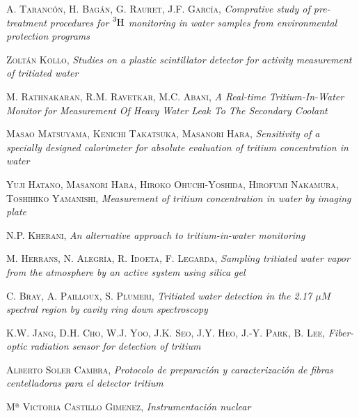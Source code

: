 \begin{thebibliography}{99}
 \textsc{A. Tarancón}, \textsc{H. Bagán}, \textsc{G. Rauret}, \textsc{J.F. García},
\textit{Comprative study of pre-treatment procedures for $\ce{^{3}H}$ monitoring in water samples from environmental protection programs}

 \textsc{Zoltán Köllo},
\textit{Studies on a plastic scintillator detector for activity measurement of tritiated water}

 \textsc{M. Rathnakaran}, \textsc{R.M. Ravetkar}, \textsc{M.C. Abani},
\textit{A Real-time Tritium-In-Water Monitor for Measurement Of Heavy Water Leak To The Secondary Coolant}

 \textsc{Masao Matsuyama}, \textsc{Kenichi Takatsuka}, \textsc{Masanori Hara}, 
\textit{Sensitivity of a specially designed calorimeter for absolute evaluation of tritium concentration in water}

 \textsc{Yuji Hatano}, \textsc{Masanori Hara}, \textsc{Hiroko Ohuchi-Yoshida}, \textsc{Hirofumi Nakamura}, \textsc{Toshihiko Yamanishi},
\textit{Measurement of tritium concentration in water by imaging plate}

\textsc{N.P. Kherani},
\textit{An alternative approach to tritium-in-water monitoring}

 \textsc{M. Herrans}, \textsc{N. Alegría}, \textsc{R. Idoeta}, \textsc{F. Legarda},
\textit{Sampling tritiated water vapor from the atmosphere by an active system using silica gel}

 \textsc{C. Bray}, \textsc{A. Pailloux}, \textsc{S. Plumeri},
\textit{Tritiated water detection in the 2.17 $\mu M$ spectral region by cavity ring down spectroscopy}

 \textsc{K.W. Jang}, \textsc{D.H. Cho}, \textsc{W.J. Yoo}, \textsc{J.K. Seo}, \textsc{J.Y. Heo}, \textsc{J.-Y. Park}, \textsc{B. Lee},
\textit{Fiber-optic radiation sensor for detection of tritium}

 \textsc{Alberto Soler Cambra},
\textit{Protocolo de preparación y caracterización de fibras centelladoras para el detector tritium}

 \textsc{Mª Victoria Castillo Gimenez},
\textit{Instrumentación nuclear} 


\end{thebibliography}
